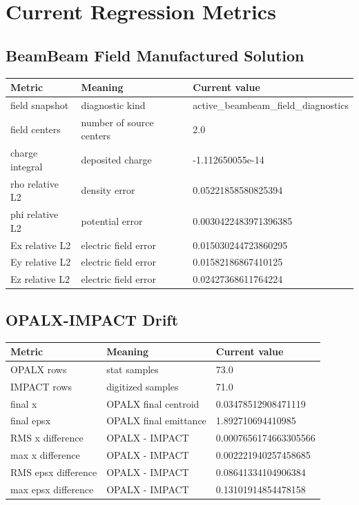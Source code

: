\documentclass[10pt]{article}
\begin{document}
\section*{Current Regression Metrics}

\subsection*{BeamBeam Field Manufactured Solution}
\begin{tabularx}{\textwidth}{@{}p{}p{}X@{}}
\toprule
Metric & Meaning & Current value \\
\midrule
field snapshot & diagnostic kind & active\_beambeam\_field\_diagnostics \\
field centers & number of source centers & 2.0 \\
charge integral & deposited charge & -1.112650055e-14 \\
rho relative L2 & density error & 0.05221858580825394 \\
phi relative L2 & potential error & 0.0030422483971396385 \\
Ex relative L2 & electric field error & 0.015030244723860295 \\
Ey relative L2 & electric field error & 0.01582186867410125 \\
Ez relative L2 & electric field error & 0.02427368611764224 \\
\bottomrule
\end{tabularx}

\subsection*{OPALX-IMPACT Drift}
\begin{tabularx}{\textwidth}{@{}p{}p{}X@{}}
\toprule
Metric & Meaning & Current value \\
\midrule
OPALX rows & stat samples & 73.0 \\
IMPACT rows & digitized samples & 71.0 \\
final x & OPALX final centroid & 0.03478512908471119 \\
final epsx & OPALX final emittance & 1.892710694410985 \\
RMS x difference & OPALX - IMPACT & 0.0007656174663305566 \\
max x difference & OPALX - IMPACT & 0.002221940257458685 \\
RMS epsx difference & OPALX - IMPACT & 0.08641334104906384 \\
max epsx difference & OPALX - IMPACT & 0.13101914854478158 \\
\bottomrule
\end{tabularx}
\end{document}
